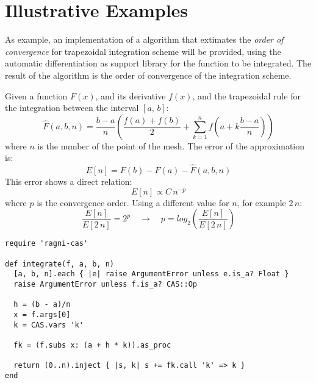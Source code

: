 \section{Illustrative Examples}
\label{sec:examples}


As example, an implementation of a algorithm that extimates the \emph{order of convergence} for trapezoidal integration scheme will be provided, using the automatic differentiation as support library for the function to be integrated. The result of the algorithm is the order of convergence of the integration scheme.

Given a function $F(x)$, and its derivative $f(x)$, and the trapezoidal rule for the integration between the interval $[a,\,b]$:
\begin{equation}
  \hat{F}(a, b, n) = \dfrac{b - a}{n} \left( \dfrac{f(a) + f(b)}{2} +
    \sum\limits_{k = 1}^{n}{f \left( a + k \dfrac{b - a}{n} \right)} \right)
\end{equation}
where $n$ is the number of the point of the mesh. The error of the approximation is:
\begin{equation}
  E[n] = F(b) - F(a) - \hat{F}(a, b, n)
\end{equation}
This error shows a direct relation:
\begin{equation}
  E[n] \propto C\,{n}^{-p}
\end{equation}
where $p$ is the convergence order. Using a different value for $n$, for example $2\,n$:
\begin{equation}
  \dfrac{E[n]}{E[2\,n]} = 2^{p} \quad \rightarrow \quad p = log_2 \left( \dfrac{E[n]}{E[2\,n]} \right)
\end{equation}

\begin{lstlisting}[caption={Metaprogramming example for },label={code:trapezoidal}]
require 'ragni-cas'

def integrate(f, a, b, n)
  [a, b, n].each { |e| raise ArgumentError unless e.is_a? Float }
  raise ArgumentError unless f.is_a? CAS::Op

  h = (b - a)/n
  x = f.args[0]
  k = CAS.vars 'k'

  fk = (f.subs x: (a + h * k)).as_proc

  return (0..n).inject { |s, k| s += fk.call 'k' => k }
end
\end{lstlisting}
